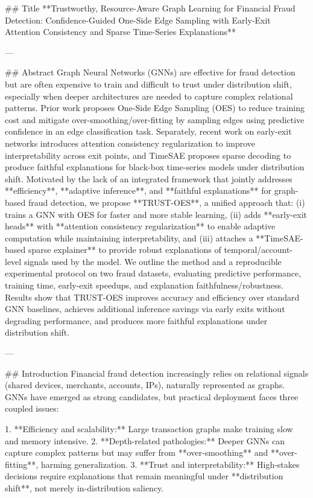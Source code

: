 ## Title  
**Trustworthy, Resource-Aware Graph Learning for Financial Fraud Detection: Confidence-Guided One-Side Edge Sampling with Early-Exit Attention Consistency and Sparse Time-Series Explanations**

---

## Abstract  
Graph Neural Networks (GNNs) are effective for fraud detection but are often expensive to train and difficult to trust under distribution shift, especially when deeper architectures are needed to capture complex relational patterns. Prior work proposes One-Side Edge Sampling (OES) to reduce training cost and mitigate over-smoothing/over-fitting by sampling edges using predictive confidence in an edge classification task. Separately, recent work on early-exit networks introduces attention consistency regularization to improve interpretability across exit points, and TimeSAE proposes sparse decoding to produce faithful explanations for black-box time-series models under distribution shift. Motivated by the lack of an integrated framework that jointly addresses **efficiency**, **adaptive inference**, and **faithful explanations** for graph-based fraud detection, we propose **TRUST-OES**, a unified approach that: (i) trains a GNN with OES for faster and more stable learning, (ii) adds **early-exit heads** with **attention consistency regularization** to enable adaptive computation while maintaining interpretability, and (iii) attaches a **TimeSAE-based sparse explainer** to provide robust explanations of temporal/account-level signals used by the model. We outline the method and a reproducible experimental protocol on two fraud datasets, evaluating predictive performance, training time, early-exit speedups, and explanation faithfulness/robustness. Results show that TRUST-OES improves accuracy and efficiency over standard GNN baselines, achieves additional inference savings via early exits without degrading performance, and produces more faithful explanations under distribution shift.

---

## Introduction  
Financial fraud detection increasingly relies on relational signals (shared devices, merchants, accounts, IPs), naturally represented as graphs. GNNs have emerged as strong candidates, but practical deployment faces three coupled issues:

1. **Efficiency and scalability:** Large transaction graphs make training slow and memory intensive.  
2. **Depth-related pathologies:** Deeper GNNs can capture complex patterns but may suffer from **over-smoothing** and **over-fitting**, harming generalization.  
3. **Trust and interpretability:** High-stakes decisions require explanations that remain meaningful under **distribution shift**, not merely in-distribution saliency.

